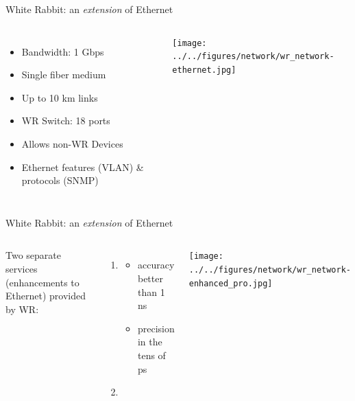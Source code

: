 \documentclass[compress, red]{beamer}
\begin{document}
\begin{frame}{White Rabbit: an \emph{extension} of Ethernet}

\begin{columns}[c]
 

  \begin{itemize}
    \item Bandwidth: 1 Gbps
    \item Single fiber medium
    \item Up to 10 km links
    \item WR Switch: 18 ports
    \item Allows non-WR Devices
    \item Ethernet features (VLAN) \& protocols (SNMP)
  \end{itemize}

    \begin{center}
    \texttt{[image: ../../figures/network/wr\_network-ethernet.jpg]}
    \end{center}
\end{columns}

\end{frame}

\begin{frame}{White Rabbit: an \emph{extension} of Ethernet}


\begin{columns}[c]
 
  Two separate services (enhancements to Ethernet) provided by WR:
\begin{enumerate}
\item \color{blue!90}{Synchronization:}
  \begin{itemize}
    \item accuracy\\ better than 1 ns
    \item precision in the tens of ps
\end{itemize}
\item \color{red}{Deterministic, reliable and low-latency Control Data delivery}
\end{enumerate}

    \begin{center}
    \texttt{[image: ../../figures/network/wr\_network-enhanced\_pro.jpg]}
    \end{center}
\end{columns}

\end{frame}
\end{document}
